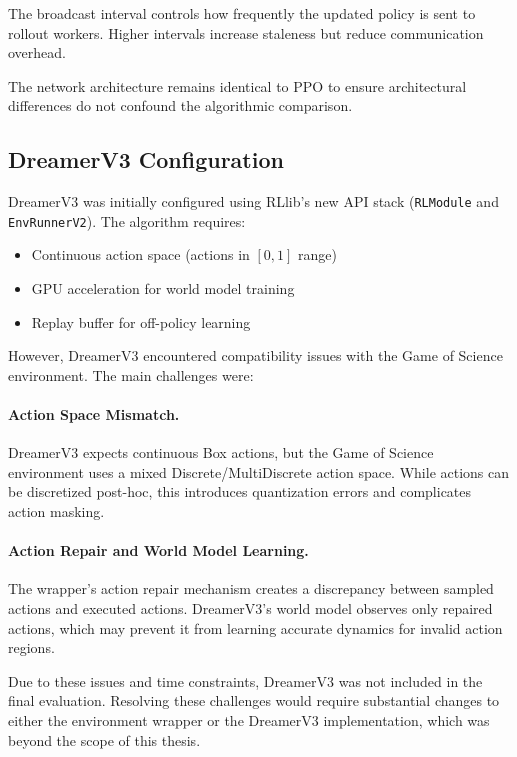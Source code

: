 \documentclass[english,bachelor]{hsluthesis}
\begin{document}
The broadcast interval controls how frequently the updated policy is sent to rollout workers. Higher intervals increase staleness but reduce communication overhead.

The network architecture remains identical to PPO to ensure architectural differences do not confound the algorithmic comparison.

\subsection{DreamerV3 Configuration}

DreamerV3 was initially configured using RLlib's new API stack (\texttt{RLModule} and \texttt{EnvRunnerV2}). The algorithm requires:

\begin{itemize}
    \item Continuous action space (actions in $[0,1]$ range)
    \item GPU acceleration for world model training
    \item Replay buffer for off-policy learning
\end{itemize}

However, DreamerV3 encountered compatibility issues with the Game of Science environment. The main challenges were:

\paragraph{Action Space Mismatch.}
DreamerV3 expects continuous Box actions, but the Game of Science environment uses a mixed Discrete/MultiDiscrete action space. While actions can be discretized post-hoc, this introduces quantization errors and complicates action masking.

\paragraph{Action Repair and World Model Learning.}
The wrapper's action repair mechanism creates a discrepancy between sampled actions and executed actions. DreamerV3's world model observes only repaired actions, which may prevent it from learning accurate dynamics for invalid action regions.

Due to these issues and time constraints, DreamerV3 was not included in the final evaluation. Resolving these challenges would require substantial changes to either the environment wrapper or the DreamerV3 implementation, which was beyond the scope of this thesis.
\end{document}
